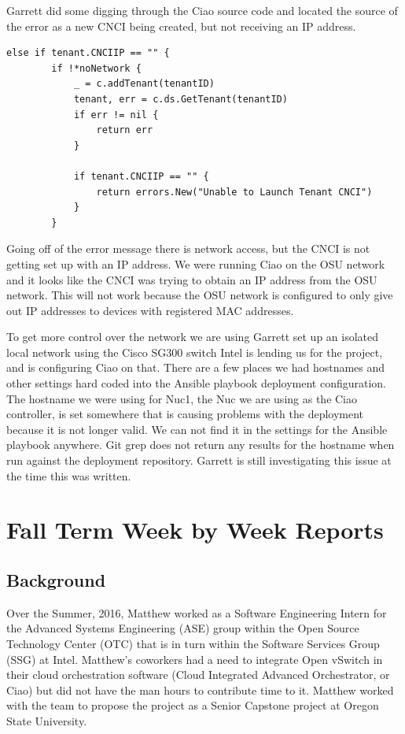 \documentclass[10pt,onecolumn,journal,draftclsnofoot]{IEEEtran}
\begin{document}
Garrett did some digging through the Ciao source code and located the source of
the error as a new CNCI being created, but not receiving an IP address.

\begin{lstlisting}[caption = Unable to launch tenant CNCI error location.]
else if tenant.CNCIIP == "" {
		if !*noNetwork {
			_ = c.addTenant(tenantID)
			tenant, err = c.ds.GetTenant(tenantID)
			if err != nil {
				return err
			}

			if tenant.CNCIIP == "" {
				return errors.New("Unable to Launch Tenant CNCI")
			}
		}
\end{lstlisting}

Going off of the error message there is network access, but the CNCI is not
getting set up with an IP address.
We were running Ciao on the OSU network and it looks like the CNCI was trying
to obtain an IP address from the OSU network. This will not work because the
OSU network is configured to only give out IP addresses to devices with
registered MAC addresses.

To get more control over the network we are using Garrett set up an isolated
local network using the Cisco SG300 switch Intel is lending us for the project,
and is configuring Ciao on that. There are a few places we had hostnames and
other settings hard coded into the Ansible playbook deployment configuration.
The hostname we were using for Nuc1, the Nuc we are using as the Ciao
controller, is set somewhere that is causing problems with the deployment
because it is not longer valid. We can not find it in the settings for the 
Ansible playbook anywhere.
Git grep does not return any results for the hostname when run against the 
deployment repository.
Garrett is still investigating this issue at the time this was written.

\section{Fall Term Week by Week Reports}

\subsection{Background}

Over the Summer, 2016, Matthew worked as a Software Engineering Intern for the
Advanced Systems Engineering (ASE) group within the Open Source Technology
Center (OTC) that is in turn within the Software Services Group (SSG) at Intel.
Matthew's coworkers had a need to integrate Open vSwitch in their cloud
orchestration software (Cloud Integrated Advanced Orchestrator, or Ciao) but did
not have the man hours to contribute time to it. Matthew worked with the team to
propose the project as a Senior Capstone project at Oregon State University.
\end{document}
